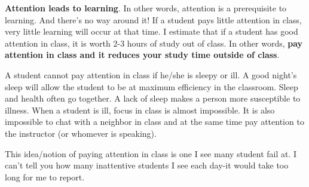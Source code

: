 \textbf{Attention leads to learning}. In other words, attention is a prerequisite to learning. And there's no way around it! If a student pays little attention in class, very little learning will occur at that time. I estimate that if a student has good attention in class, it is worth 2-3 hours of study out of class. In other words, \textbf{pay attention in class and it reduces your study time outside of class}.

A student cannot pay attention in class if he/she is sleepy or ill. A good night's sleep will allow the student to be at maximum efficiency  in the classroom. Sleep and health often go together. A lack of sleep makes a person more susceptible to illness. When a student is ill, focus in class is almost impossible. It is also impossible to chat with a neighbor in class and at the same time pay attention to the instructor (or whomever is speaking).

This idea/notion of paying attention in class is one I see many student fail at. I can't tell you how many inattentive students I see each day-it would take too long for me to report.
